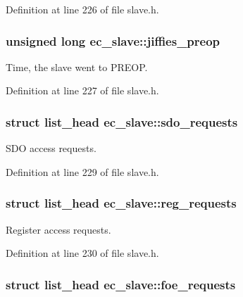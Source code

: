 \-Definition at line 226 of file slave.\-h.

\subsubsection[{jiffies\-\_\-preop}]{\setlength{\rightskip}{0pt plus 5cm}unsigned long {\bf ec\-\_\-slave\-::jiffies\-\_\-preop}}\label{structec__slave_af177795f6287be576f617772d18e3dee}


\-Time, the slave went to \-P\-R\-E\-O\-P. 



\-Definition at line 227 of file slave.\-h.

\subsubsection[{sdo\-\_\-requests}]{\setlength{\rightskip}{0pt plus 5cm}struct list\-\_\-head {\bf ec\-\_\-slave\-::sdo\-\_\-requests}}\label{structec__slave_a6cbec4e34923f5b25fecdbd166a8328a}


\-S\-D\-O access requests. 



\-Definition at line 229 of file slave.\-h.

\subsubsection[{reg\-\_\-requests}]{\setlength{\rightskip}{0pt plus 5cm}struct list\-\_\-head {\bf ec\-\_\-slave\-::reg\-\_\-requests}}\label{structec__slave_a614562e4df0afc3707515ae9f1df0ffc}


\-Register access requests. 



\-Definition at line 230 of file slave.\-h.

\subsubsection[{foe\-\_\-requests}]{\setlength{\rightskip}{0pt plus 5cm}struct list\-\_\-head {\bf ec\-\_\-slave\-::foe\-\_\-requests}}\label{structec__slave_a374ce6a1879d81ca54496be994b9e46e}


